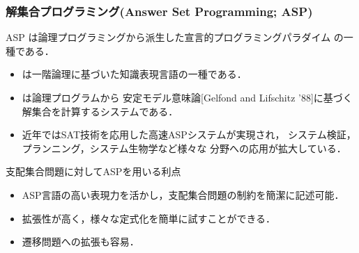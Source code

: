 \documentclass[dvipdfmx,10pt]{beamer}
\begin{document}
\begin{frame}\frametitle{解集合プログラミング(Answer Set Programming; ASP)}
  \begin{block}{}\centering
    ASP は論理プログラミングから派生した宣言的プログラミングパラダイム
    の一種である．
  \end{block}
  \vfill
  \begin{itemize}
  \item {}は一階論理に基づいた知識表現言語の一種である．
  \item {}は論理プログラムから
	安定モデル意味論[Gelfond and Lifschitz '88]に基づく
	解集合を計算するシステムである．
  \item 近年ではSAT技術を応用した高速ASPシステムが実現され，
	システム検証，プランニング，システム生物学など様々な
	分野への応用が拡大している．
 \end{itemize}
 \begin{alertblock}{支配集合問題に対してASPを用いる利点}
  \begin{itemize}
   \item ASP言語の高い表現力を活かし，支配集合問題の制約を簡潔に記述可能．
   \item 拡張性が高く，様々な定式化を簡単に試すことができる．
   \item 遷移問題への拡張も容易．
  \end{itemize}
 \end{alertblock}
\end{frame}
 
%
%
\end{document}
